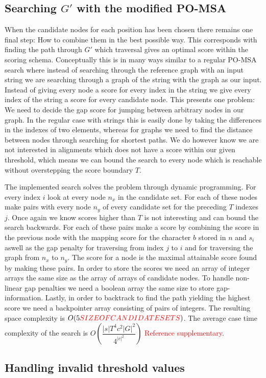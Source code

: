 \documentclass{article}
\begin{document}
\subsection{Searching $G'$ with the modified PO-MSA}
When the candidate nodes for each position has been chosen there remains one final step: How to combine them in the best possible way. This corresponds with finding the path through $G'$ which traversal gives an optimal score within the scoring schema. Conceptually this is in many ways similar to a regular PO-MSA search where instead of searching through the reference graph with an input string we are searching through a graph of the string with the graph as our input. Instead of giving every node a score for every index in the string we give every index of the string a score for every candidate node. This presents one problem: We need to decide the gap score for jumping between arbitrary nodes in our graph. In the regular case with strings this is easily done by taking the differences in the indexes of two elements, whereas for graphs we need to find the distance between nodes through searching for shortest paths. We do however know we are not interested in alignments which does not have a score within our given threshold, which means we can bound the search to every node which is reachable without overstepping the score boundary $T$.\\
\par\noindent
The implemented search solves the problem through dynamic programming. For every index $i$ look at every node $n_x$ in the candidate set. For each of these nodes make pairs with every node $n_y$ of every candidate set for the preceding $T$ indexes $j$. Once again we know scores higher than $T$ is not interesting and can bound the search backwards. For each of these pairs make a score by combining the score in the previous node with the mapping score for the character $b$ stored in $n$ and $s_i$ aswell as the gap penalty for traversing from index $j$ to $i$ and for traversing the graph from $n_x$ to $n_y$. The score for a node is the maximal attainable score found by making these pairs. In order to store the scores we need an array of integer arrays the same size as the array of arrays of candidate nodes. To handle non-linear gap penalties we need a boolean array the same size to store gap-information. Lastly, in order to backtrack to find the path yielding the highest score we need a backpointer array consisting of pairs of integers. The resulting space complexity is $O(5\textcolor{red}{SIZE OF CANDIDATE SETS})$. The average case time complexity of the search is $O(\dfrac{|s|T^4c^2|G|^2}{4^{|c|^2}})$ \textcolor{red}{Reference supplementary}.
\subsection{Handling invalid threshold values}
\end{document}
